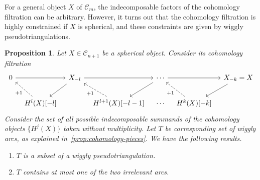 \documentclass{amsart}
\newtheorem{proposition}[theorem]{Proposition}
\theoremstyle{definition}
\begin{document}
For a general object \(X\) of \(\mathcal{C}_m\), the indecomposable factors of the cohomology filtration can be arbitrary.
However, it turns out that the cohomology filtration is highly constrained if \(X\) is spherical, and these constraints are given by wiggly pseudotriangulations.
\begin{proposition}\label{prop:hn-filtration}
  Let \(X \in \mathcal{C}_{n+1}\) be a spherical object.
  Consider its cohomology filtration
  \[
    \begin{tikzcd}[column sep=0.3cm]
      0 \arrow{rr} && X_{-l} \arrow{dl} \arrow{rr} && \cdots \arrow{rr} \arrow{dl} && X_{-k} = X \arrow{dl}\\
      & H^l(X)[-l] \arrow[dashed]{ul}{+1} && H^{l+1}(X)[-l-1] \arrow[dashed]{ul}{+1} & \cdots & H^k(X)[-k] \arrow[dashed]{ul}{+1}
    \end{tikzcd}
  \]
  Consider the set of all possible indecomposable summands of the cohomology objects \(\{H^j(X)\}\) taken without multiplicity.
  Let \(T\) be corresponding set of wiggly arcs, as explained in~\cref{prop:cohomology-pieces}.
  We have the following results.
  \begin{enumerate}
  \item 
    \(T\) is a subset of a wiggly pseudotriangulation.
  \item \(T\) contains at most one of the two irrelevant arcs.
  \end{enumerate}
\end{proposition}
\end{document}
